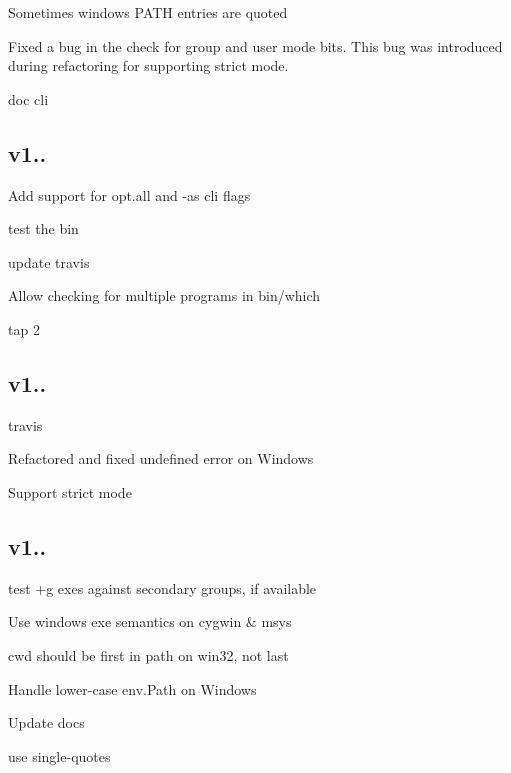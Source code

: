 \begin{DoxyItemize}
\item Sometimes windows P\+A\+TH entries are quoted
\item Fixed a bug in the check for group and user mode bits. This bug was introduced during refactoring for supporting strict mode.
\item doc cli
\end{DoxyItemize}

\subsection*{v1..}


\begin{DoxyItemize}
\item Add support for opt.\+all and -\/as cli flags
\item test the bin
\item update travis
\item Allow checking for multiple programs in bin/which
\item tap 2
\end{DoxyItemize}

\subsection*{v1..}


\begin{DoxyItemize}
\item travis
\item Refactored and fixed undefined error on Windows
\item Support strict mode
\end{DoxyItemize}

\subsection*{v1..}


\begin{DoxyItemize}
\item test +g exes against secondary groups, if available
\item Use windows exe semantics on cygwin \& msys
\item cwd should be first in path on win32, not last
\item Handle lower-\/case \textquotesingle{}env.\+Path\textquotesingle{} on Windows
\item Update docs
\item use single-\/quotes
\end{DoxyItemize}

